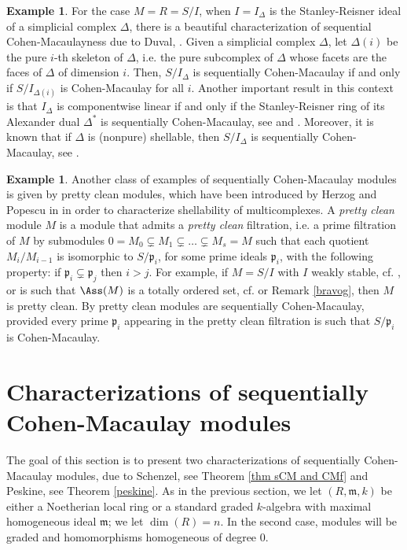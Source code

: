 \documentclass[12pt]{amsart}
\theoremstyle{definition}
\theoremstyle{definition}
\newtheorem{example}[theorem]{Example}
\newcommand{\m}{\mathfrak{m}}
\def\frk{\mathfrak}               %
\def\pp{{\frk p}}
\begin{document}
\begin{example}\label{Alexander}
For the case  $M=R=S/I$, when $I=I_\Delta$ is the Stanley-Reisner ideal of a simplicial complex $\Delta$, there is a beautiful characterization of sequential Cohen-Macaulayness due to Duval, \cite[Theorem 3.3]{D96}.  Given a simplicial complex $\Delta$, let $\Delta(i)$ be the pure $i$-th skeleton of $\Delta$, i.e. the pure subcomplex of $\Delta$ whose facets are the faces of $\Delta$ of dimension $i$. Then, $S/I_{\Delta}$ is sequentially Cohen-Macaulay if and only if $S/I_{\Delta(i)}$ is Cohen-Macaulay for all $i$. 
Another important result in this context is that $I_\Delta$ is componentwise linear if and only if the Stanley-Reisner ring of its Alexander dual $\Delta^*$  is sequentially Cohen-Macaulay, see \cite[Theorem 2.1]{HH99} and \cite[Theorem 8.2.20]{HH11}. Moreover, it is known that if $\Delta$ is (nonpure) shellable, then $S/I_{\Delta}$ is sequentially Cohen-Macaulay, see \cite[Corollary 8.2.19]{HH11}.   
\end{example}

\begin{example}\label{prettybaby} Another class of examples of sequentially Cohen-Macaulay modules is given by pretty clean modules, which have been introduced by Herzog and Popescu in \cite{HP06} in order to characterize shellability of multicomplexes. A {\em pretty clean} module $M$ is a module that admits a {\em pretty clean} filtration, i.e. a prime filtration of $M$ by submodules $0=M_0 \subsetneq M_1 \subsetneq \ldots\subsetneq M_s=M$ such that each quotient $M_i/M_{i-1}$ is isomorphic to $S/\pp_i$, for some prime ideals $\pp_i$, with the following property: if $\pp_i\subsetneq \pp_j$ then $i>j$. For example, if $M=S/I$ with $I$ weakly stable, cf. \cite[Proposition 5.2]{HP06}, or is such that $\Ass(M)$ is a totally ordered set, cf. \cite[Proposition 5.1]{HP06} or Remark \ref{bravog}, then $M$ is pretty clean.  
By \cite[Theorem 4.1]{HP06} pretty clean modules are sequentially Cohen-Macaulay, provided every prime $\pp_i$ appearing in the pretty clean filtration is such that $S/\pp_i$ is Cohen-Macaulay.
  \end{example}
\normalcolor

\section{Characterizations of sequentially Cohen-Macaulay modules}


  
\noindent
The goal of this section is to present two characterizations of sequentially Cohen-Macaulay modules, due to Schenzel, see Theorem \ref{thm sCM and CMf} and Peskine, see Theorem \ref{peskine}.  As in the previous section, we let $(R,\m,k)$ be either a Noetherian local ring or a standard graded $k$-algebra with maximal homogeneous ideal $\m$;  we let $\dim(R)=n$.  In the second case, modules will be graded and homomorphisms homogeneous of degree 0.
\end{document}
